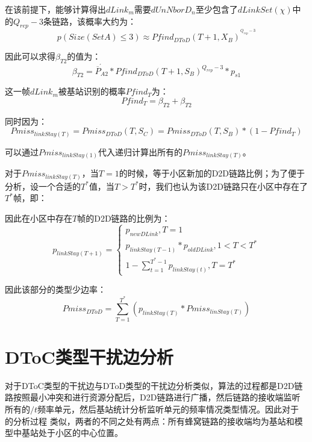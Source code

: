 \documentclass[figurelist,tablelist,algorithmlist,nomlist,masters]{seuthesix}
\begin{document}
	在该前提下，能够计算得出$dLink_m$需要$dUnNborD_n$至少包含了$dLinkSet(\chi )$中的$Q_{rep} - 3$条链路，该概率大约为：
	\begin{equation}\label{eq3.1}
	p(Size(SetA) \le 3) \approx Pfin{d_{DToD}}{(T + 1,X_B)^{^{Q_{rep} - 3}}}
	\end{equation}
	
	因此可以求得$\beta _{T2}$的值为：
	\begin{equation}\label{eq3.1}
	\beta _{T2} = \acute{\overline P _{A2}} * Pfin{d_{DToD}}{(T + 1,S_B)^{Q_{rep} - 3}}*{p_{s1}}
	\end{equation}
	
	这一帧$dLink_m$被基站识别的概率$Pfin{d_T}$为：
	\begin{equation}\label{eq3.1}
	Pfin{d_T} = \beta _{T2} + \beta _{T2}
	\end{equation}
	
	同时因为：
	\begin{equation}\label{eq3.1}
	Pmis{s_{linkStay(T)}} = Pmis{s_{DToD}}(T,S_C) = Pmis{s_{DToD}}(T,S_B)*(1 - Pfin{d_T})
	\end{equation}
	
	可以通过$Pmis{s_{linkStay(1)}}$代入递归计算出所有的$Pmis{s_{linkStay(T)}}$。
	
	对于$Pmis{s_{linkStay(T)}}$，当$T=1$的时候，等于小区新加的D2D链路比例；为了便于分析，设一个合适的$T^*$值，当$T > T^*$时，我们也认为该D2D链路只在小区中存在了$T^*$帧，即：
	
	因此在小区中存在$T$帧的D2D链路的比例为：
	\begin{equation}\label{eq3.1}
	{p_{linkStay(T + 1)}} = \left\{ \begin{array}{l}
	{p_{newDLink}},T = 1\\
	{p_{linkStay(T - 1)}}*{p_{oldDLink}},1 < T < T^* \\
	1 - \sum\limits_{t = 1}^{{T^*} - 1} {{p_{linkStay(t)}}} ,T = T^*
	\end{array} \right.
	\end{equation}
	
	因此该部分的类型少边率：
	\begin{equation}\label{eq3.1}
	Pmis{s_{DToD}} = \sum\limits_{T = 1}^{{T^*}} {({p_{linkStay(T)}}*Pmis{s_{linStay(T)}})}
	\end{equation}
	
	
	\section{DToC类型干扰边分析}
	对于DToC类型的干扰边与DToD类型的干扰边分析类似，算法的过程都是D2D链路按照最小冲突和进行资源分配后，D2D链路进行广播，然后链路的接收端监听所有的$/t$频率单元，然后基站统计分析监听单元的频率情况类型情况。因此对于 的分析过程 类似，两者的不同之处有两点：所有蜂窝链路的接收端均为基站和模型中基站处于小区的中心位置。
	
\end{document}
